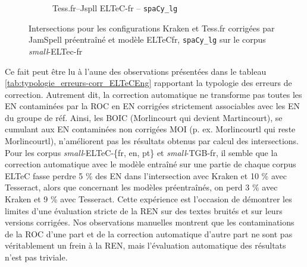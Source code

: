 \begin{figure}[h!]
\begin{minipage}{6.5cm}
\begin{subfigure}{0.8\textwidth}
  \caption{Tess.fr--Jspll ELTeC-fr -- \texttt{spaCy\_lg}}
  \label{fig:ELTeCFRA_Tess -- jspl-ELTeCFR_spacy-lg-concat_intersection}
  \end{subfigure}
    \end{minipage}
\caption{Intersections pour les configurations Kraken et Tess.fr corrigées par JamSpell préentraîné et modèle ELTeCfr, \texttt{spaCy\_lg} sur le corpus \textit{small}-ELTec-fr}
\label{fig:intersection_globale-kraken}
\end{figure}

Ce fait peut être lu à l'aune des observations présentées dans le tableau \ref{tab:typologie_erreurs-corr_ELTeCEng} rapportant la typologie des erreurs de correction. Autrement dit, la correction automatique ne transforme pas toutes les EN contaminées par la ROC en EN corrigées strictement associables avec les EN du groupe de réf. Ainsi, les BOIC (\og{}Morlincourt\fg{} qui devient \og{}Martincourt\fg{}), se cumulant aux EN contaminées non corrigées MOI (p. ex. \og{}Morlincourtl\fg{} qui reste \og{}Morlincourtl\fg{}), n'améliorent pas les résultats obtenus par calcul des intersections. Pour les corpus \textit{small}-ELTeC-\{fr, en, pt\} et \textit{small}-TGB-fr, il semble que la correction automatique avec le modèle entraîné sur une partie de chaque corpus ELTeC fasse perdre 5 \% des EN dans l'intersection avec Kraken et 10 \% avec Tesseract, alors que concernant les modèles préentraînés, on perd 3 \% avec Kraken et 9 \% avec Tesseract. Cette expérience est l'occasion de démontrer les limites d'une évaluation stricte de la REN sur des textes bruités et sur leurs versions corrigées. Nos observations manuelles montrent que les contaminations de la ROC d'une part et de la correction automatique d'autre part ne sont pas véritablement un frein à la REN, mais l'évaluation automatique des résultats n'est pas triviale.


